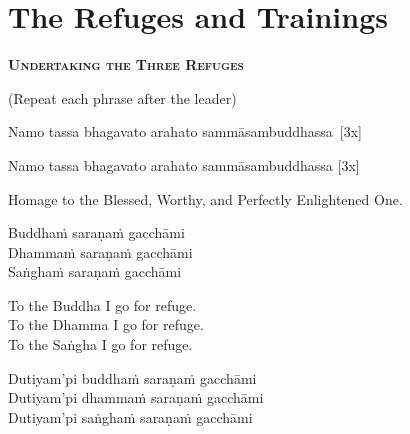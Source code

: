 
\section{The Refuges and Trainings}

\begin{center}
  \textbf{\textsc{Undertaking the Three Refuges}}\makeatletter\hyperlink{endnote138-appendix}\makeatother
\end{center}

\begin{center}
  (Repeat each phrase after the leader)
\end{center}

\ifninebythirteen

\begin{pali-hang}
Namo tassa bhagavato arahato \mbox{sammāsambuddhassa}~\hfill{[3x]}
\end{pali-hang}

\else

\begin{pali-hang}
Namo tassa bhagavato arahato sammāsambuddhassa \hfill{[3x]}
\end{pali-hang}

\fi

\begin{english-hang}
  Homage to the Blessed, Worthy, and Perfectly Enlightened One.
\end{english-hang}

Buddhaṁ saraṇaṁ gacchāmi\\
Dhammaṁ saraṇaṁ gacchāmi\\
Saṅghaṁ saraṇaṁ gacchāmi

\begin{english-verses}
  To the Buddha I go for refuge.\\
  To the Dhamma I go for refuge.\\
  To the Saṅgha I go for refuge.
\end{english-verses}

Dutiyam'pi buddhaṁ saraṇaṁ gacchāmi\\
Dutiyam'pi dhammaṁ saraṇaṁ gacchāmi\\
Dutiyam'pi saṅghaṁ saraṇaṁ gacchāmi

